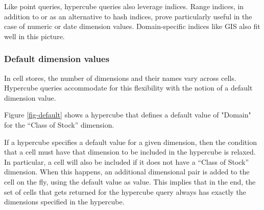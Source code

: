 \documentclass{vldb}
\begin{document}
Like point queries, hypercube queries also leverage indices. Range indices, in addition to or as an alternative to hash indices, prove particularly useful in the case of numeric or date dimension values. Domain-specific indices like GIS also fit well in this picture.

\subsubsection{Default dimension values}

In cell stores, the number of dimensions and their names vary across cells. Hypercube queries accommodate for this flexibility with the notion of a default dimension value.

Figure \ref{fig-default} shows a hypercube that defines a default value of "Domain" for the ``Class of Stock'' dimension.

If a hypercube specifies a default value for a given dimension, then the condition that a cell must have that dimension to be included in the hypercube is relaxed. In particular, a cell will also be included if it does not have a ``Class of Stock'' dimension. When this happens, an additional dimensional pair is added to the cell on the fly, using the default value as value. This implies that in the end, the set of cells that gets returned for the hypercube query always has exactly the dimensions specified in the hypercube.
\end{document}

